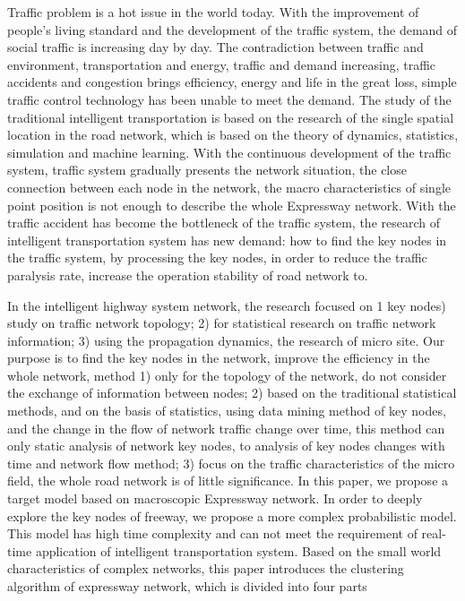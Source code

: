 \begin{eabstract}
	Traffic problem is a hot issue in the world today. With the improvement of people's living standard and the development of the traffic system, the demand of social traffic is increasing day by day. The contradiction between traffic and environment, transportation and energy, traffic and demand increasing, traffic accidents and congestion brings efficiency, energy and life in the great loss, simple traffic control technology has been unable to meet the demand. The study of the traditional intelligent transportation is based on the research of the single spatial location in the road network, which is based on the theory of dynamics, statistics, simulation and machine learning. With the continuous development of the traffic system, traffic system gradually presents the network situation, the close connection between each node in the network, the macro characteristics of single point position is not enough to describe the whole Expressway network. With the traffic accident has become the bottleneck of the traffic system, the research of intelligent transportation system has new demand: how to find the key nodes in the traffic system, by processing the key nodes, in order to reduce the traffic paralysis rate, increase the operation stability of road network to.
	
	In the intelligent highway system network, the research focused on 1 key nodes) study on traffic network topology; 2) for statistical research on traffic network information; 3) using the propagation dynamics, the research of micro site. Our purpose is to find the key nodes in the network, improve the efficiency in the whole network, method 1) only for the topology of the network, do not consider the exchange of information between nodes; 2) based on the traditional statistical methods, and on the basis of statistics, using data mining method of key nodes, and the change in the flow of network traffic change over time, this method can only static analysis of network key nodes, to analysis of key nodes changes with time and network flow method; 3) focus on the traffic characteristics of the micro field, the whole road network is of little significance. In this paper, we propose a target model based on macroscopic Expressway network. In order to deeply explore the key nodes of freeway, we propose a more complex probabilistic model. This model has high time complexity and can not meet the requirement of real-time application of intelligent transportation system. Based on the small world characteristics of complex networks, this paper introduces the clustering algorithm of expressway network, which is divided into four parts
	

\end{eabstract}
